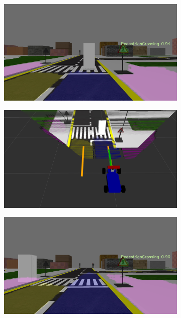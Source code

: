 \begin{figure}[h]
  \centering
  \begin{subfigure}[b]{0.45\linewidth}
    \includegraphics[width=\linewidth]{figures/experiments/pedestrian-crossing-stop-img.png}
  \end{subfigure}
  \begin{subfigure}[b]{0.45\linewidth}
    \includegraphics[width=\linewidth]{figures/experiments/pedestrian-crossing-stop-pc.png}
  \end{subfigure}
  \begin{subfigure}[b]{0.45\linewidth}
    \includegraphics[width=\linewidth]{figures/experiments/pedestrian-crossing-go-img.png}

\end{subfigure}
\end{figure}
